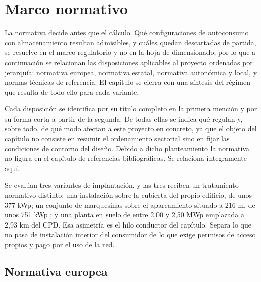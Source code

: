 \chapter{Marco normativo}
\label{ch:marco-normativo}


La normativa decide antes que el cálculo. Qué configuraciones de autoconsumo con almacenamiento resultan admisibles, y cuáles quedan descartadas de partida, se resuelve en el marco regulatorio y no en la hoja de dimensionado, por lo que a continuación se relacionan las disposiciones aplicables al proyecto ordenadas por jerarquía: normativa europea, normativa estatal, normativa autonómica y local, y normas técnicas de referencia. El capítulo se cierra con una síntesis del régimen que resulta de todo ello para cada variante.

Cada disposición se identifica por su título completo en la primera mención y por su forma corta a partir de la segunda. De todas ellas se indica qué regulan y, sobre todo, de qué modo afectan a este proyecto en concreto, ya que el objeto del capítulo no consiste en resumir el ordenamiento sectorial sino en fijar las condiciones de contorno del diseño. Debido a dicho planteamiento la normativa no figura en el capítulo de referencias bibliográficas. Se relaciona íntegramente aquí.

Se evalúan tres variantes de implantación, y las tres reciben un tratamiento normativo distinto: una instalación sobre la cubierta del propio edificio, de unos 377 kWp; un conjunto de marquesinas sobre el aparcamiento situado a 216 m, de unos 751 kWp ; y una planta en suelo de entre 2,00 y 2,50 MWp emplazada a 2,93 km del \ac{CPD}. Esa asimetría es el hilo conductor del capítulo. Separa lo que no pasa de instalación interior del consumidor de lo que exige permisos de acceso propios y pago por el uso de la red.

\section{Normativa europea}
\label{sec:norm-europea}

